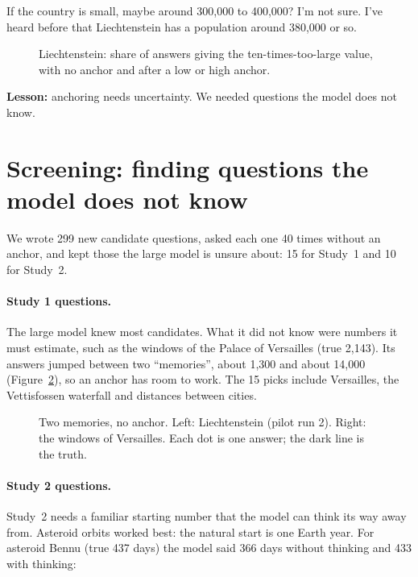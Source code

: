 \documentclass[11pt,a4paper]{article}
\begin{document}
\begin{transcript}
\cut{} If the country is small, maybe around 300,000 to 400,000? I'm not sure. \cut{} I've heard before that Liechtenstein has a population around 380,000 or so.
\end{transcript}

\begin{figure}[ht]
\centering{}
\caption{Liechtenstein: share of answers giving the ten-times-too-large value, with no anchor and after a low or high anchor.}
\label{fig:liech}
\end{figure}

\textbf{Lesson:} anchoring needs uncertainty. We needed questions the model does not know.

\section{Screening: finding questions the model does not know}
\label{sec:screen}

\begin{inshort}
We wrote 299 new candidate questions, asked each one 40 times without an anchor, and kept those the large model is unsure about: 15 for Study~1 and 10 for Study~2.
\end{inshort}

\paragraph{Study 1 questions.} The large model knew most candidates. What it did not know were numbers it must estimate, such as the windows of the Palace of Versailles (true 2,143). Its answers jumped between two \enquote{memories}, about 1,300 and about 14,000 (Figure~\ref{fig:versailles}), so an anchor has room to work. The 15 picks include Versailles, the Vettisfossen waterfall and distances between cities.

\begin{figure}[ht]
\centering{}
\caption{Two memories, no anchor. Left: Liechtenstein (pilot run 2). Right: the windows of Versailles. Each dot is one answer; the dark line is the truth.}
\label{fig:versailles}
\end{figure}

\paragraph{Study 2 questions.} Study~2 needs a familiar starting number that the model can think its way away from. Asteroid orbits worked best: the natural start is one Earth year. For asteroid Bennu (true 437 days) the model said 366 days without thinking and 433 with thinking:
\end{document}
